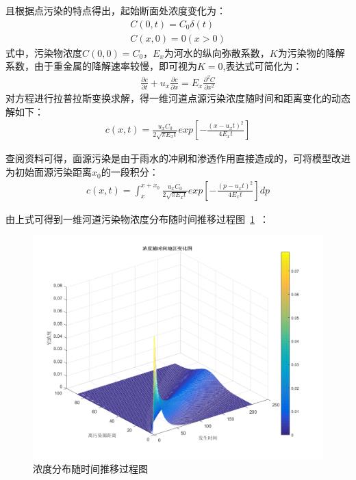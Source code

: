 \documentclass{whutmod}
\begin{document}
	且根据点污染的特点得出，起始断面处浓度变化为：
	\begin{gather*}
	C(0,t)=C_{0}\delta (t)\\
	 C(x,0)=0(x>0)
	\end{gather*}
	式中，污染物浓度$C(0,0)=C_{0}$，$E_{x}$为河水的纵向弥散系数，$K$为污染物的降解系数，由于重金属的降解速率较慢，即可视为$K=0$,表达式可简化为：
		\begin{gather*}
	 \frac{\partial c}{\partial t}+u_{x}\frac{\partial c}{\partial x}=E_{x}\frac{\partial^{2} C}{\partial x^{2}}
	\end{gather*}
	对方程进行拉普拉斯变换求解\parencite{张永祥2018龙江河镉污染分布及迁移研究}，得一维河道点源污染浓度随时间和距离变化的动态解如下：
			\begin{gather}
	c(x,t)=\frac{u_{x}C_{0}}{2\sqrt{\pi E_{x}t}}exp[-\frac{(x-u_{x}t)^{2}}{4E_{x}t}]
	\end{gather}
	
	查阅资料可得\parencite{geng2019novel}，面源污染是由于雨水的冲刷和渗透作用直接造成的，可将模型改进为初始面源污染距离$x_{0}$的一段积分\parencite{xie2019intra}：
			\begin{gather}
c(x,t)=\int_{x}^{x+x_{0}}\frac{u_{x}C_{0}}{2\sqrt{\pi E_{x}t}}exp[-\frac{(p-u_{x}t)^{2}}{4E_{x}t}]dp
	\end{gather}
	
	由上式可得到一维河道污染物浓度分布随时间推移过程图~\ref{llllll}~：
			
	\begin{figure}[H]
		\centering
		\includegraphics[width=\textwidth]{figures/matlab.png}
		\caption{浓度分布随时间推移过程图}\label{llllll}
	\end{figure}
	
\end{document}
